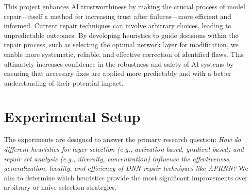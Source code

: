 \documentclass{article}
\begin{document}

This project enhances AI trustworthiness by making the crucial process of model repair—itself a method for increasing trust after failures—more efficient and informed. Current repair techniques can involve arbitrary choices, leading to unpredictable outcomes. By developing heuristics to guide decisions within the repair process, such as selecting the optimal network layer for modification, we enable more systematic, reliable, and effective correction of identified flaws. This ultimately increases confidence in the robustness and safety of AI systems by ensuring that necessary fixes are applied more predictably and with a better understanding of their potential impact.

\section{Experimental Setup}

The experiments are designed to answer the primary research question:
\textit{How do different heuristics for layer selection (e.g., activation-based, gradient-based) and repair set analysis (e.g., diversity, concentration) influence the effectiveness, generalization, locality, and efficiency of DNN repair techniques like APRNN?}
We aim to determine which heuristics provide the most significant improvements over arbitrary or naive selection strategies.
\end{document}
